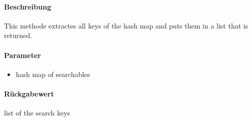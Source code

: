 \paragraph*{Beschreibung}
This methode extractes all keys of the hash map and puts them in a list that is returned.
\paragraph*{Parameter}
\begin{itemize}
    \item hash map of searchables
\end{itemize}
\paragraph*{Rückgabewert}
list of the search keys